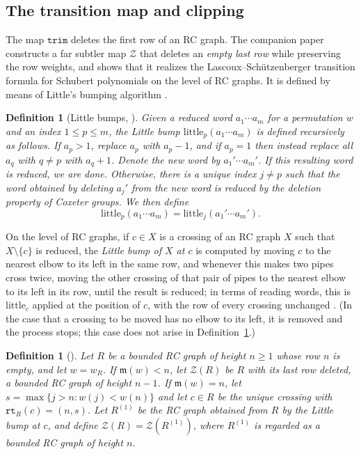 \documentclass[pdflatex,sn-mathphys-num]{sn-jnl}
\numberwithin{equation}{subsection}
\newcommand{\wof}[1]{w_{#1}}
\newcommand{\rtt}{\mathtt{rt}}
\newcommand{\trm}{\mathtt{trim}}
\newcommand{\zeromap}{\mathcal{Z}}
\newcommand{\ltb}{\mathrm{little}}
\newcommand{\maxd}{\mathfrak{m}}
\theoremstyle{thmstyleone}
\theoremstyle{thmstylethree}
\newtheorem{definition}[lemma]{Definition}
\theoremstyle{thmstyletwo}
\begin{document}
\subsection{The transition map and clipping}\label{section:cliptrim}

The map $\trm$ deletes the first row of an RC graph. The companion paper constructs a far subtler map $\zeromap$ that deletes an \emph{empty last row} while preserving the row weights, and shows that it realizes the Lascoux--Sch\"utzenberger transition formula for Schubert polynomials on the level of RC graphs. It is defined by means of Little's bumping algorithm \cite{little2003combinatorial}.

\begin{definition}[Little bumps, {\cite[Definition~\ref*{B-definition:littlebump}]{samuelbialgebra}}]\label{definition:littlebump}
  Given a reduced word $a_1\cdots a_m$ for a permutation $w$ and an index $1\leq p\leq m$, the \emph{Little bump} $\ltb_p(a_1\cdots a_m)$ is defined recursively as follows. If $a_p>1$, replace $a_p$ with $a_p-1$, and if $a_p=1$ then instead replace all $a_q$ with $q\neq p$ with $a_q+1$. Denote the new word by $a_1'\cdots a_m'$. If this resulting word is reduced, we are done. Otherwise, there is a unique index $j\neq p$ such that the word obtained by deleting $a_j'$ from the new word is reduced by the deletion property of Coxeter groups. We then define
  $$\ltb_p(a_1\cdots a_m) = \ltb_j(a_1'\cdots a_m').$$
\end{definition}

On the level of RC graphs, if $c\in X$ is a crossing of an RC graph $X$ such that $X\setminus\{c\}$ is reduced, the \emph{Little bump of $X$ at $c$} is computed by moving $c$ to the nearest elbow to its left in the same row, and whenever this makes two pipes cross twice, moving the other crossing of that pair of pipes to the nearest elbow to its left in its row, until the result is reduced; in terms of reading words, this is $\ltb_c$ applied at the position of $c$, with the row of every crossing unchanged \cite[\S\ref*{B-section:bpd}]{samuelbialgebra}. (In the case that a crossing to be moved has no elbow to its left, it is removed and the process stops; this case does not arise in Definition~\ref{definition:zeromap}.)

\begin{definition}[{\cite[Definition~\ref*{B-definition:zeromap}]{samuelbialgebra}}]\label{definition:zeromap}
Let $R$ be a bounded RC graph of height $n\geq 1$ whose row $n$ is empty, and let $w=\wof R$. If $\maxd(w)<n$, let $\zeromap(R)$ be $R$ with its last row deleted, a bounded RC graph of height $n-1$. If $\maxd(w)=n$, let $s=\max\{j>n: w(j)<w(n)\}$ and let $c\in R$ be the unique crossing with $\rtt_R(c)=(n,s)$. Let $R^{(1)}$ be the RC graph obtained from $R$ by the Little bump at $c$, and define $\zeromap(R)=\zeromap(R^{(1)})$, where $R^{(1)}$ is regarded as a bounded RC graph of height $n$.
\end{definition}
\end{document}
